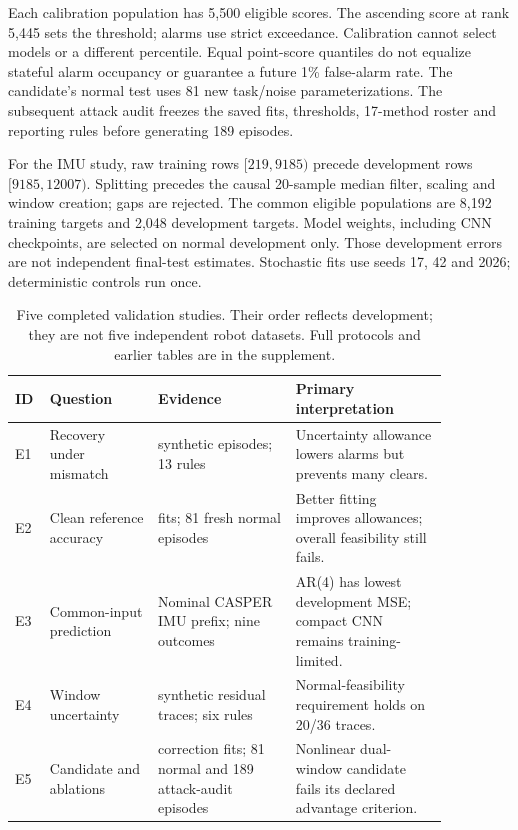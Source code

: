 \documentclass[11pt]{article}
\begin{document}
Each calibration population has 5,500 eligible scores. The ascending score at rank 5,445 sets the threshold; alarms use strict exceedance. Calibration cannot select models or a different percentile. Equal point-score quantiles do not equalize stateful alarm occupancy or guarantee a future 1\% false-alarm rate. The candidate's normal test uses 81 new task/noise parameterizations. The subsequent attack audit freezes the saved fits, thresholds, 17-method roster and reporting rules before generating 189 episodes.

For the IMU study, raw training rows $[219,9185)$ precede development rows $[9185,12007)$. Splitting precedes the causal 20-sample median filter, scaling and window creation; gaps are rejected. The common eligible populations are 8,192 training targets and 2,048 development targets. Model weights, including CNN checkpoints, are selected on normal development only. Those development errors are not independent final-test estimates. Stochastic fits use seeds 17, 42 and 2026; deterministic controls run once.

\begin{table}[t]
\centering\small
\caption{Five completed validation studies. Their order reflects development; they are not five independent robot datasets. Full protocols and earlier tables are in the supplement.}\label{tab:studies}
\begin{tabular}{>{\raggedright\arraybackslash}p{0.04\linewidth}>{\raggedright\arraybackslash}p{0.22\linewidth}>{\raggedright\arraybackslash}p{0.29\linewidth}>{\raggedright\arraybackslash}p{0.31\linewidth}}\toprule
ID & Question & Evidence & Primary interpretation \\\midrule
E1 & Recovery under mismatch & 216 synthetic episodes; 13 rules & Uncertainty allowance lowers alarms but prevents many clears.\\
E2 & Clean reference accuracy & 63 fits; 81 fresh normal episodes & Better fitting improves allowances; overall feasibility still fails.\\
E3 & Common-input prediction & Nominal CASPER IMU prefix; nine outcomes & AR(4) has lowest development MSE; compact CNN remains training-limited.\\
E4 & Window uncertainty & 36 synthetic residual traces; six rules & Normal-feasibility requirement holds on 20/36 traces.\\
E5 & Candidate and ablations & 30 correction fits; 81 normal and 189 attack-audit episodes & Nonlinear dual-window candidate fails its declared advantage criterion.\\\bottomrule
\end{tabular}
\end{table}
\end{document}
